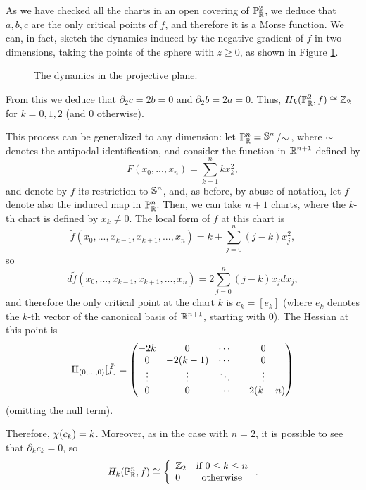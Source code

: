 \begin{exmpl}
As we have checked all the charts in an open covering of $\mathbb{P}_{\mathbb{R}}^2$, we deduce that $a,b,c$ are the only critical points of $f$, and therefore it is a Morse function. We can, in fact, sketch the dynamics induced by the negative gradient of $f$ in two dimensions, taking the points of the sphere with $z \geq 0$, as shown in Figure \ref{figure:example5}.

\begin{figure}[h]
	\centering
	
	\caption{The dynamics in the projective plane.}
	\label{figure:example5}
\end{figure}

From this we deduce that $\partial_2c = 2b = 0$ and $\partial_2b=2a=0$. Thus, $H_k(\mathbb{P}_{\mathbb{R}}^2,f) \cong \mathbb{Z}_2$ for $k=0,1,2$ (and $0$ otherwise).

This process can be generalized to any dimension: let $\con{P}_{\R}^n = \quocient{\con{S}^n}{\sim}$, where $\sim$ denotes the antipodal identification, and consider the function in $\mathbb{R}^{n+1}$ defined by
\[F(x_0,...,x_n) = \sum_{k=1}^n kx_k^2 ,\]
and denote by $f$ its restriction to $\mathbb{S}^n$, and, as before, by abuse of notation, let $f$ denote also the induced map in $\mathbb{P}_{\mathbb{R}}^n$.
Then, we can take $n+1$ charts, where the $k$-th chart is defined by $x_k \neq 0$. The local form of $f$ at this chart is
\[\tilde{f}(x_0,...,x_{k-1},x_{k+1},...,x_n) = k + \sum_{j=0}^n (j-k)x_j^2 ,\]
so
\[d\tilde{f}(x_0,...,x_{k-1},x_{k+1},...,x_n) = 2\sum_{j=0}^n (j-k) x_j dx_j ,\]
and therefore the only critical point at the chart $k$ is $c_k = [e_k]$ (where $e_k$ denotes the $k$-th vector of the canonical basis of $\mathbb{R}^{n+1}$, starting with $0$). The Hessian at this point is
\[\operatorname H_{(0,...,0)}[\tilde{f}] = \begin{pmatrix} -2k & 0 & \cdots & 0 \\ 0 & -2(k-1) & \cdots & 0 \\ \vdots & \vdots & \ddots & \vdots \\ 0 & 0 & \cdots & -2(k-n) \end{pmatrix}\]
(omitting the null term).

Therefore, $\chi(c_k) = k$. Moreover, as in the case with $n=2$, it is possible to see that $\partial_kc_k = 0$, so
\[H_k(\mathbb{P}_{\mathbb{R}}^n,f) \cong \left\{ \begin{array}{lc} \mathbb{Z}_2 & \text{if } 0 \leq k \leq n \\ 0 & \text{otherwise} \end{array} \right. .\]
\end{exmpl}
